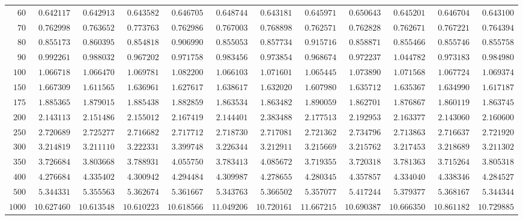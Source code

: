 \begin{sidewaystable}
\begin{tabular}{r|rrrrrrrrrrr}
$60$ & $0.642117$ & $0.642913$ & $0.643582$ & $0.646705$ & $0.648744$ & $0.643181$ & $0.645971$ & $0.650643$ & $0.645201$ & $0.646704$ & $0.643100$ \\
$70$ & $0.762998$ & $0.763652$ & $0.773763$ & $0.762986$ & $0.767003$ & $0.768898$ & $0.762571$ & $0.762828$ & $0.762671$ & $0.767221$ & $0.764394$ \\
$80$ & $0.855173$ & $0.860395$ & $0.854818$ & $0.906990$ & $0.855053$ & $0.857734$ & $0.915716$ & $0.858871$ & $0.855466$ & $0.855746$ & $0.855758$ \\
$90$ & $0.992261$ & $0.988032$ & $0.967202$ & $0.971758$ & $0.983456$ & $0.973854$ & $0.968674$ & $0.972237$ & $1.044782$ & $0.973183$ & $0.984980$ \\
$100$ & $1.066718$ & $1.066470$ & $1.069781$ & $1.082200$ & $1.066103$ & $1.071601$ & $1.065445$ & $1.073890$ & $1.071568$ & $1.067724$ & $1.069374$ \\
$150$ & $1.667309$ & $1.611565$ & $1.636961$ & $1.627617$ & $1.638617$ & $1.632020$ & $1.607980$ & $1.635712$ & $1.635367$ & $1.634990$ & $1.617187$ \\
$175$ & $1.885365$ & $1.879015$ & $1.885438$ & $1.882859$ & $1.863534$ & $1.863482$ & $1.890059$ & $1.862701$ & $1.876867$ & $1.860119$ & $1.863745$ \\
$200$ & $2.143113$ & $2.151486$ & $2.155012$ & $2.167419$ & $2.144401$ & $2.383488$ & $2.177513$ & $2.192953$ & $2.163377$ & $2.143060$ & $2.160600$ \\
$250$ & $2.720689$ & $2.725277$ & $2.716682$ & $2.717712$ & $2.718730$ & $2.717081$ & $2.721362$ & $2.734796$ & $2.713863$ & $2.716637$ & $2.721920$ \\
$300$ & $3.214819$ & $3.211110$ & $3.222331$ & $3.399748$ & $3.226344$ & $3.212911$ & $3.215669$ & $3.215762$ & $3.217453$ & $3.218689$ & $3.211302$ \\
$350$ & $3.726684$ & $3.803668$ & $3.788931$ & $4.055750$ & $3.783413$ & $4.085672$ & $3.719355$ & $3.720318$ & $3.781363$ & $3.715264$ & $3.805318$ \\
$400$ & $4.276684$ & $4.335402$ & $4.300942$ & $4.294484$ & $4.309987$ & $4.278655$ & $4.280345$ & $4.357857$ & $4.334040$ & $4.338346$ & $4.284527$ \\
$500$ & $5.344331$ & $5.355563$ & $5.362674$ & $5.361667$ & $5.343763$ & $5.366502$ & $5.357077$ & $5.417244$ & $5.379377$ & $5.368167$ & $5.344344$ \\
$1000$ & $10.627460$ & $10.613548$ & $10.610223$ & $10.618566$ & $11.049206$ & $10.720161$ & $11.667215$ & $10.690387$ & $10.666350$ & $10.861182$ & $10.729885$ \\
\hline
\end{tabular}
\end{sidewaystable}
 
